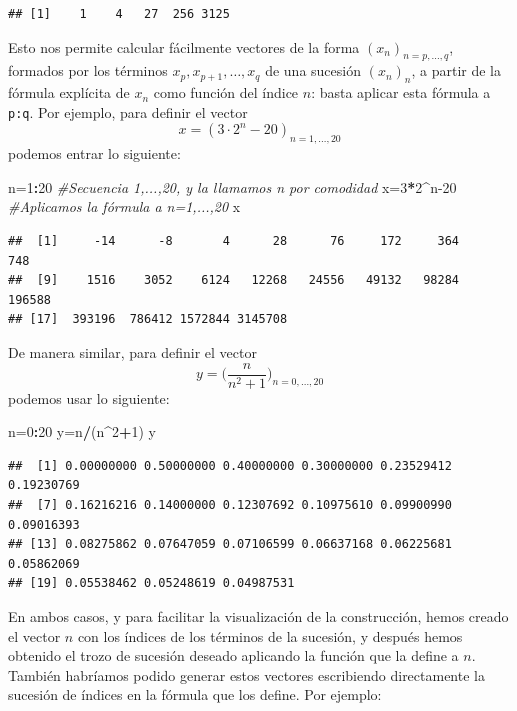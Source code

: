 \documentclass[]{book}
\newenvironment{Shaded}{\begin{snugshade}}{\end{snugshade}}
\newcommand{\CommentTok}[1]{\textcolor[rgb]{0.56,0.35,0.01}{\textit{#1}}}
\newcommand{\DecValTok}[1]{\textcolor[rgb]{0.00,0.00,0.81}{#1}}
\newcommand{\NormalTok}[1]{#1}
\newcommand{\OperatorTok}[1]{\textcolor[rgb]{0.81,0.36,0.00}{\textbf{#1}}}
\theoremstyle{definition}
\theoremstyle{definition}
\theoremstyle{definition}
\theoremstyle{remark}
\begin{document}
\begin{verbatim}
## [1]    1    4   27  256 3125
\end{verbatim}

Esto nos permite calcular fácilmente vectores de la forma \((x_n)_{n=p, \ldots, q}\), formados por los términos \(x_p, x_{p+1}, \ldots, x_q\) de una sucesión \((x_n)_n\), a partir de la fórmula explícita de \(x_n\) como función del índice \(n\): basta aplicar esta fórmula a \texttt{p:q}. Por ejemplo, para definir el vector
\[
x=(3\cdot 2^n-20)_{n=1, \ldots, 20}
\]
podemos entrar lo siguiente:

\begin{Shaded}
\begin{Highlighting}[]
\NormalTok{n=}\DecValTok{1}\OperatorTok{:}\DecValTok{20} \CommentTok{#Secuencia 1,...,20, y la llamamos n por comodidad}
\NormalTok{x=}\DecValTok{3}\OperatorTok{*}\DecValTok{2}\OperatorTok{^}\NormalTok{n}\DecValTok{-20} \CommentTok{#Aplicamos la fórmula a n=1,...,20}
\NormalTok{x}
\end{Highlighting}
\end{Shaded}

\begin{verbatim}
##  [1]     -14      -8       4      28      76     172     364     748
##  [9]    1516    3052    6124   12268   24556   49132   98284  196588
## [17]  393196  786412 1572844 3145708
\end{verbatim}

De manera similar, para definir el vector
\[
y=\Big(\dfrac{n}{n^2+1}\Big)_{n=0, \ldots, 20}
\]
podemos usar lo siguiente:

\begin{Shaded}
\begin{Highlighting}[]
\NormalTok{n=}\DecValTok{0}\OperatorTok{:}\DecValTok{20}
\NormalTok{y=n}\OperatorTok{/}\NormalTok{(n}\OperatorTok{^}\DecValTok{2}\OperatorTok{+}\DecValTok{1}\NormalTok{)}
\NormalTok{y}
\end{Highlighting}
\end{Shaded}

\begin{verbatim}
##  [1] 0.00000000 0.50000000 0.40000000 0.30000000 0.23529412 0.19230769
##  [7] 0.16216216 0.14000000 0.12307692 0.10975610 0.09900990 0.09016393
## [13] 0.08275862 0.07647059 0.07106599 0.06637168 0.06225681 0.05862069
## [19] 0.05538462 0.05248619 0.04987531
\end{verbatim}

En ambos casos, y para facilitar la visualización de la construcción, hemos creado el vector \(n\) con los índices de los términos de la sucesión, y después hemos obtenido el trozo de sucesión deseado aplicando la función que la define a \(n\). También habríamos podido generar estos vectores escribiendo directamente la sucesión de índices en la fórmula que los define. Por ejemplo:
\end{document}
